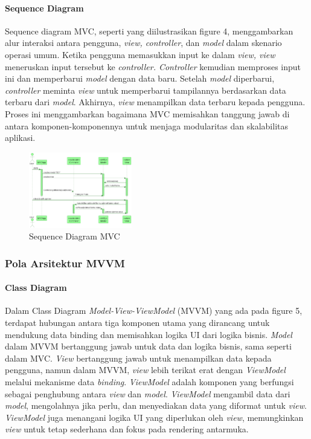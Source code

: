 \documentclass[conference]{IEEEtran}
\begin{document}
	\paragraph{Sequence Diagram}
	Sequence diagram  MVC, seperti yang diilustrasikan figure 4, menggambarkan alur interaksi antara pengguna, \textit{view, controller}, dan \textit{model} dalam skenario operasi umum. Ketika pengguna memasukkan input ke dalam \textit{view, view} meneruskan input tersebut ke \textit{controller. Controller} kemudian memproses input ini dan memperbarui \textit{model} dengan data baru. Setelah \textit{model} diperbarui, \textit{controller} meminta \textit{view} untuk memperbarui tampilannya berdasarkan data terbaru dari \textit{model}. Akhirnya, \textit{view} menampilkan data terbaru kepada pengguna. Proses ini menggambarkan bagaimana MVC memisahkan tanggung jawab di antara komponen-komponennya untuk menjaga modularitas dan skalabilitas aplikasi.
	
	
	\begin{figure}[h]
		\centering
		\includegraphics[width=0.4\textwidth]{../Class_Sequence_Diagram/out/MVC_SequenceDiagram/MVC_SequenceDiagram}
		\caption{Sequence Diagram MVC}
		\label{fig:Sequence_mvc}
	\end{figure}
	
	
	\subsubsection{Pola Arsitektur MVVM}
	\paragraph{Class Diagram}
	Dalam Class Diagram \textit{Model-View-ViewModel} (MVVM) yang ada pada figure 5, terdapat hubungan antara tiga komponen utama yang dirancang untuk mendukung data binding dan memisahkan logika UI dari logika bisnis. \textit{Model} dalam MVVM bertanggung jawab untuk data dan logika bisnis, sama seperti dalam MVC. \textit{View} bertanggung jawab untuk menampilkan data kepada pengguna, namun dalam MVVM, \textit{view} lebih terikat erat dengan \textit{ViewModel} melalui mekanisme data \textit{binding}. \textit{ViewModel} adalah komponen yang berfungsi sebagai penghubung antara \textit{view} dan \textit{model}. \textit{ViewModel} mengambil data dari \textit{model}, mengolahnya jika perlu, dan menyediakan data yang diformat untuk \textit{view}. \textit{ViewModel} juga menangani logika UI yang diperlukan oleh \textit{view}, memungkinkan \textit{view} untuk tetap sederhana dan fokus pada rendering antarmuka.
	
\end{document}
